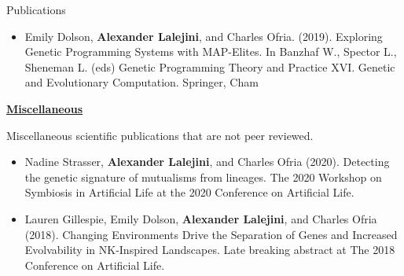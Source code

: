 \begin{rSection}{Publications}
\begin{itemize}
\item Emily Dolson, \textbf{Alexander Lalejini}, and Charles Ofria. (2019).
Exploring Genetic Programming Systems with MAP-Elites.
In Banzhaf W., Spector L., Sheneman L. (eds) Genetic Programming Theory and Practice XVI. Genetic and Evolutionary Computation. Springer, Cham

\end{itemize}

\underline{\large {\bf Miscellaneous}}

Miscellaneous scientific publications that are not peer reviewed.

\begin{itemize}

\item Nadine Strasser, \textbf{Alexander Lalejini}, and Charles Ofria (2020).
Detecting the genetic signature of mutualisms from lineages.
The 2020 Workshop on Symbiosis in Artificial Life at the 2020 Conference on Artificial Life.

\item Lauren Gillespie, Emily Dolson, \textbf{Alexander Lalejini}, and Charles Ofria (2018).
Changing Environments Drive the Separation of Genes and Increased Evolvability in NK-Inspired Landscapes.
Late breaking abstract at The 2018 Conference on Artificial Life.

\end{itemize}

\end{rSection}